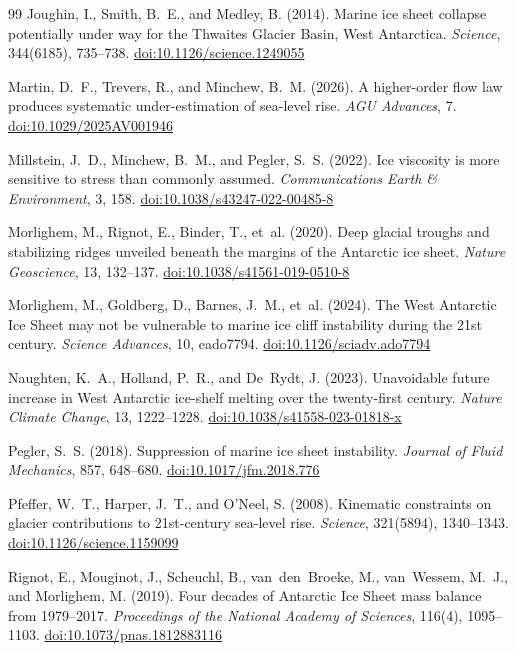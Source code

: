 \documentclass[11pt]{article}
\newcommand{\doi}[1]{\href{https://doi.org/#1}{doi:#1}}
\begin{document}
\begin{thebibliography}{99}
Joughin, I., Smith, B.~E., and Medley, B. (2014).
Marine ice sheet collapse potentially under way for the {T}hwaites {G}lacier {B}asin, {W}est {A}ntarctica.
\textit{Science}, 344(6185), 735--738.
\doi{10.1126/science.1249055}

Martin, D.~F., Trevers, R., and Minchew, B.~M. (2026).
A higher-order flow law produces systematic under-estimation of sea-level rise.
\textit{AGU Advances}, 7.
\doi{10.1029/2025AV001946}

Millstein, J.~D., Minchew, B.~M., and Pegler, S.~S. (2022).
Ice viscosity is more sensitive to stress than commonly assumed.
\textit{Communications Earth \& Environment}, 3, 158.
\doi{10.1038/s43247-022-00485-8}

Morlighem, M., Rignot, E., Binder, T., et~al. (2020).
Deep glacial troughs and stabilizing ridges unveiled beneath the margins of the {A}ntarctic ice sheet.
\textit{Nature Geoscience}, 13, 132--137.
\doi{10.1038/s41561-019-0510-8}

Morlighem, M., Goldberg, D., Barnes, J.~M., et~al. (2024).
The {W}est {A}ntarctic {I}ce {S}heet may not be vulnerable to marine ice cliff instability during the 21st century.
\textit{Science Advances}, 10, eado7794.
\doi{10.1126/sciadv.ado7794}

Naughten, K.~A., Holland, P.~R., and De~Rydt, J. (2023).
Unavoidable future increase in {W}est {A}ntarctic ice-shelf melting over the twenty-first century.
\textit{Nature Climate Change}, 13, 1222--1228.
\doi{10.1038/s41558-023-01818-x}

Pegler, S.~S. (2018).
Suppression of marine ice sheet instability.
\textit{Journal of Fluid Mechanics}, 857, 648--680.
\doi{10.1017/jfm.2018.776}

Pfeffer, W.~T., Harper, J.~T., and O'Neel, S. (2008).
Kinematic constraints on glacier contributions to 21st-century sea-level rise.
\textit{Science}, 321(5894), 1340--1343.
\doi{10.1126/science.1159099}

Rignot, E., Mouginot, J., Scheuchl, B., van~den~Broeke, M., van~Wessem, M.~J., and Morlighem, M. (2019).
Four decades of {A}ntarctic {I}ce {S}heet mass balance from 1979--2017.
\textit{Proceedings of the National Academy of Sciences}, 116(4), 1095--1103.
\doi{10.1073/pnas.1812883116}


\end{thebibliography}
\end{document}
